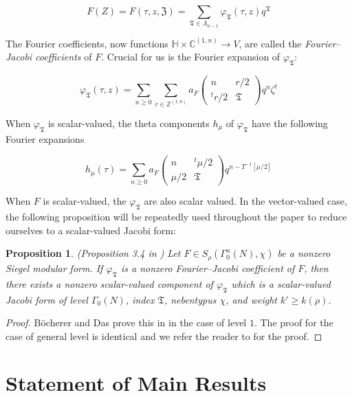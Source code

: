 \documentclass[11pt]{article}
\newtheorem{proposition}[theorem]{Proposition}
\theoremstyle{definition}
\theoremstyle{remark}
\newcommand{\C}{\mathbb{C}}
\newcommand{\Z}{\mathbb{Z}}
\newcommand{\h}{\mathbb{H}}
\begin{document}
\[
F(Z) = F(\tau,z,\mathfrak{Z}) = \sum_{\mathfrak{T} \in \Lambda_{n-1}} \varphi_{\mathfrak{T}}(\tau,z) q^{\mathfrak{T}}
\]

The Fourier coefficients, now functions $\h \times \C^{(1,n)} \to V$, are called the \textit{Fourier--Jacobi coefficients} of $F$. Crucial for us is the Fourier expansion of $\varphi_\mathfrak{T}$:

\[
\varphi_\mathfrak{T}(\tau,z) = \sum_{n \geq 0} \sum_{r \in \Z^{(1,n)}} a_F\begin{pmatrix}
    n & r/2 \\ ^tr/2 & \mathfrak{T}
\end{pmatrix} q^n \zeta^t
\]

When $\varphi_\mathfrak{T}$ is scalar-valued, the theta components $h_\mu$ of $\varphi_\mathfrak{T}$ have the following Fourier expansions

\[
h_\mu(\tau) = \sum_{n \geq 0} a_F\begin{pmatrix}
    n & ^t\mu/2 \\ \mu/2 & \mathfrak{T}
\end{pmatrix} q^{n - T^{-1} [\mu/2]}
\]

When $F$ is scalar-valued, the $\varphi_\mathfrak{T}$ are also scalar valued. In the vector-valued case, the following proposition will be repeatedly used throughout the paper to reduce ourselves to a scalar-valued Jacobi form: \\

\begin{proposition} (Proposition 3.4 in \cite{BD}) \label{reduce to scalar}
    Let $F \in S_\rho(\Gamma_0^n(N),\chi)$ be a nonzero Siegel modular form. If $\varphi_\mathfrak{T}$ is a nonzero Fourier--Jacobi coefficient of $F$, then there exists a nonzero scalar-valued component of $\varphi_\mathfrak{T}$ which is a scalar-valued Jacobi form of level $\Gamma_0(N)$, index $\mathfrak{T}$, nebentypus $\chi$, and weight $k' \geq k(\rho)$.  
\end{proposition}

\begin{proof}
    B\"ocherer and Das prove this in \cite{BD} in the case of level $1$. The proof for the case of general level is identical and we refer the reader to \cite{BD} for the proof. 
\end{proof}



\section{Statement of Main Results} \label{Main results}
\end{document}
